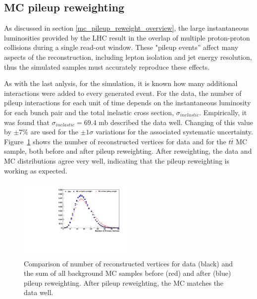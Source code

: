 \subsection{MC pileup reweighting}
\label{mc_pileup_reweight_II_overview}

\par As discussed in section \ref{mc_pileup_reweight_overview}, the
large instantaneous luminosities provided by the LHC result in the
overlap of multiple proton-proton collisions during a single read-out
window.  These "pileup events'' affect many aspects of the
reconstruction, including lepton isolation and jet energy resolution,
thus the simulated samples must accurately reproduce these effects.

\par As with the last anlysis, for the simulation, it is known how many
additional interactions were added to every generated event.  For the
data, the number of pileup interactions for each unit of time depends
on the instantaneous luminosity for each bunch pair and the total
inelastic cross section, \(\sigma_{inelastic}\).  Empirically, it was
found that \(\sigma_{inelastic} = 69.4\) mb described the data well.
Changing of this value by \(\pm 7\%\) are used for the $\pm1\sigma$
variations for the associated systematic uncertainty.
Figure~\ref{fig:PUrewgt} shows the number of reconstructed vertices
for data and for the $t\bar{t}$ MC sample, both before and after
pileup reweighting.  After reweighting, the data and MC distributions
agree very well, indicating that the pileup reweighting is working as
expected. 


\begin{figure}[hbtp]
 \begin{center}
   \includegraphics[width=0.5\textwidth]{Figures/Analysis_2_Diagrams/pileUpReWeighting_4Jincl2Tincl.pdf}
   \caption{Comparison of number of reconstructed vertices for data
     (black) and the sum of all background MC samples before (red) and after (blue) pileup
     reweighting.  After pileup reweighting, the MC matches the data well.}
   \label{fig:PUrewgt}
 \end{center}
\end{figure}


